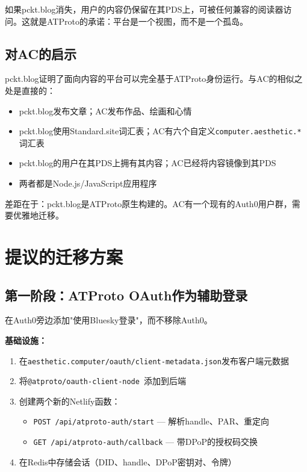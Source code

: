 \documentclass[10pt,letterpaper,twocolumn]{article}
\begin{document}
如果pckt.blog消失，用户的内容仍保留在其PDS上，可被任何兼容的阅读器访问。这就是ATProto的承诺：平台是一个视图，而不是一个孤岛。

\subsection{对AC的启示}

pckt.blog证明了面向内容的平台可以完全基于ATProto身份运行。与AC的相似之处是直接的：

\begin{itemize}
  \item pckt.blog发布文章；AC发布作品、绘画和心情
  \item pckt.blog使用Standard.site词汇表；AC有六个自定义\texttt{computer.aesthetic.*}词汇表
  \item pckt.blog的用户在其PDS上拥有其内容；AC已经将内容镜像到其PDS
  \item 两者都是Node.js/JavaScript应用程序
\end{itemize}

差距在于：pckt.blog是ATProto原生构建的。AC有一个现有的Auth0用户群，需要优雅地迁移。


\section{提议的迁移方案}
\label{sec:migration}

\subsection{第一阶段：ATProto OAuth作为辅助登录}

在Auth0旁边添加"使用Bluesky登录"，而不移除Auth0。

\textbf{基础设施：}
\begin{enumerate}
  \item 在\texttt{aesthetic.computer/oauth/client-metadata.json}发布客户端元数据
  \item 将\texttt{@atproto/oauth-client-node}~\citep{npmAtprotoOauth}添加到后端
  \item 创建两个新的Netlify函数：
    \begin{itemize}
      \item \texttt{POST /api/atproto-auth/start} --- 解析handle、PAR、重定向
      \item \texttt{GET /api/atproto-auth/callback} --- 带DPoP的授权码交换
    \end{itemize}
  \item 在Redis中存储会话（DID、handle、DPoP密钥对、令牌）
\end{enumerate}
\end{document}
